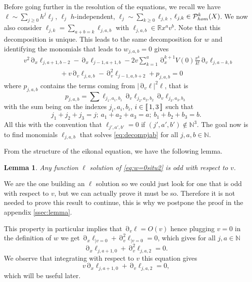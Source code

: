 \documentclass[12pt]{amsart}
\newcommand{\N}{\mathbb N}
\newcommand{\R}{\mathbb R}
\numberwithin{equation}{section}
\numberwithin{figure}{section}
\DeclareMathOperator{\p}{\partial}
\newcommand{\lb}{\operatorname{[\negthinspace [}}
\newcommand{\rb}{\operatorname{]\negthinspace ]}}
\newtheorem{lemma}[defin]{Lemma}
\begin{document}
Before going further in the resolution of the equations, we recall we have $\ell\sim\sum_{j\geq0}h^j\ell_j$, $\ell_j$ $h$-independent, $\ell_j\sim\sum_{k\geq0}\ell_{j,k}$, $\ell_{j,k}\in{\mathcal P}^k_{hom}(X)$. We now also consider $\ell_{j,k} = \sum_{a+b=k}\ell_{j,a,b}$ with $\ell_{j,a,b}\in\R x^av^b$. Note that this decomposition is unique. This leads to the same decomposition for $w$ and identifying the monomials that leads to $w_{j,a,b}=0$ %
gives
\begin{equation}\label{eq:decompjab}
\begin{aligned}
    &v^2\p_x\ell_{j,a+1,b-2} - \p_x\ell_{j-1,a+1,b} - 2v\sum_{k=1}^a\p_x^{k+1}V(0)\frac{x^k}{k!}\p_v\ell_{j,a-k,b}\\
    &\phantom{********}+ v\p_v\ell_{j,a,b} - \p_v^2\ell_{j-1,a,b+2} + p_{j,a,b} = 0
\end{aligned}
\end{equation}
where %
$p_{j,a,b}$ contains the terms coming from $|\p_v\ell|^2\ell$, that is
\begin{equation*}
p_{j,a,b} = \sum\ell_{j_1,a_1,b_1}\p_v\ell_{j_2,a_2,b_2}\p_v\ell_{j_3,a_3,b_3}
\end{equation*}
with the sum being on the indexes $j_i,a_i,b_i$, $i\in\lb1,3\rb$ such that
\begin{equation*}
j_1 + j_2 + j_3 = j;\ a_1 + a_2 + a_3 = a;\ b_1 + b_2 + b_3 = b.
\end{equation*}
All this with the convention that $\ell_{j',a',b'} = 0$ if $(j',a',b')\notin\N^3$. The goal now is to find monomials $\ell_{j,a,b}$ that solves \eqref{eq:decompjab} for all $j,a,b\in\N$.

From the structure of the eikonal equation, we have the following lemma.
\begin{lemma}\label{lem:situ2}
    Any function $\ell$ solution of \eqref{eq:w=0situ2} is odd with respect to $v$.
\end{lemma}
We are the one building an $\ell$ solution so we could just look for one that is odd with respect to $v$, but we can actually prove it must be so. Therefore it is not needed to prove this result to continue, this is why we postpone the proof in the appendix \ref{ssec:lemma}.

This property in particular implies that $\p_v\ell = O(v)$ hence plugging $v=0$ in the definition of $w$ we get $\p_x\ell_{|v=0} + \p_v^2\ell_{|v=0} = 0$, which gives for all $j,a\in\N$
\begin{equation*}
\p_x\ell_{j,a+1,0} + \p_v^2\ell_{j,a,2} = 0.
\end{equation*}
We observe that integrating with respect to $v$ this equation gives
\begin{equation}\label{eq:linkell2}
v\p_x\ell_{j,a+1,0} + \p_v\ell_{j,a,2} = 0,
\end{equation}
which will be useful later.
\end{document}
